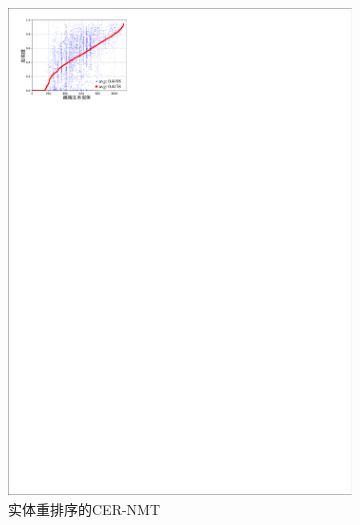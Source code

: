 \begin{figure}[!htbp]
\begin{subfigure}[b]{0.5\textwidth}
      \includegraphics[width=\textwidth]{Img/fig_4_fidelity_cer_selforder.pdf}
      \caption{实体重排序的CER-NMT}
      \label{fig:4_fidelity_cer_selforder}
    \end{subfigure}%
    ~%
    \begin{subfigure}[b]{0.5\textwidth}

\end{subfigure}
\end{figure}
